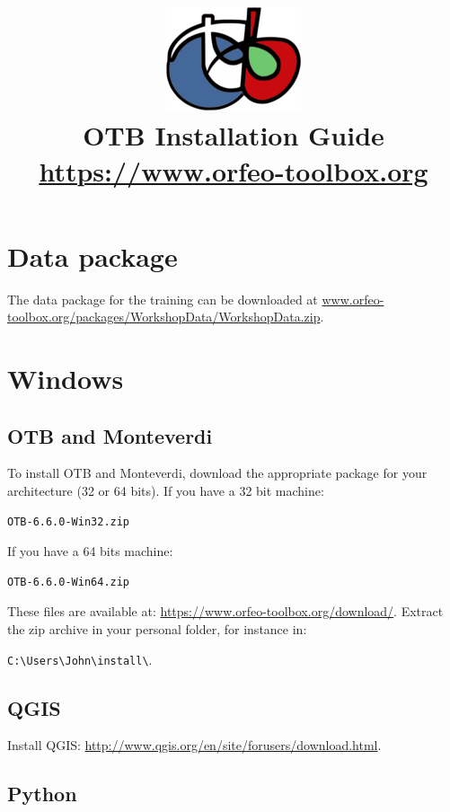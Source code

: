 \documentclass[10pt,a4paper]{article}
\title{\includegraphics[scale=1]{Art/otb-logo.png}\\
  OTB Installation Guide\\
  {\small\url{https://www.orfeo-toolbox.org}}
}
\begin{document}
\maketitle

\tableofcontents

\clearpage
\section{Data package}

The data package for the training can be downloaded at
\url{www.orfeo-toolbox.org/packages/WorkshopData/WorkshopData.zip}.

\section{Windows}

\subsection{OTB and Monteverdi}
To install OTB and Monteverdi, download the appropriate package for your
architecture (32 or 64 bits). If you have a 32 bit machine:

\begin{verbatim}
OTB-6.6.0-Win32.zip
\end{verbatim}

If you have a 64 bits machine:

\begin{verbatim}
OTB-6.6.0-Win64.zip
\end{verbatim}

These files are available at:
\url{https://www.orfeo-toolbox.org/download/}.
Extract the zip archive in your personal folder, for instance in:\\
\begin{centering}
\texttt{C:{\textbackslash}Users{\textbackslash}John{\textbackslash}install{\textbackslash}}.
\end{centering}

\subsection{QGIS}
Install QGIS: \url{http://www.qgis.org/en/site/forusers/download.html}.

\subsection{Python}
\end{document}
